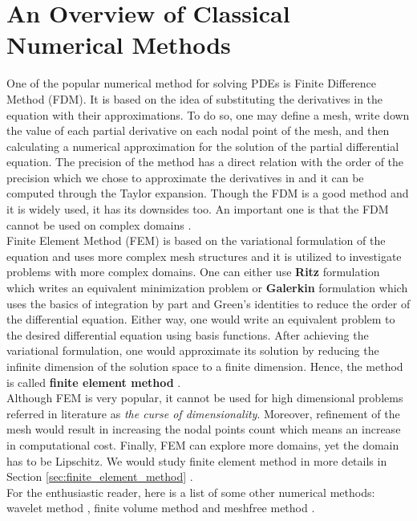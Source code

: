 \section{An Overview of Classical Numerical Methods}
\label{sec:overviewof_FEM_FDM}
One of the popular  numerical method for solving PDEs is  Finite Difference Method (FDM). It is based on the idea of substituting the derivatives in the equation with their approximations. To do so, one may define a mesh, write down the value of each partial derivative on each nodal point of the mesh, and then calculating a numerical approximation for the solution of the partial differential equation. The precision of the method has a direct relation with the order of the precision which we chose to approximate the derivatives in and it can be computed through the Taylor expansion. Though the FDM is a good method and it is widely used, it has its downsides too. An important one is that the FDM cannot be used on complex domains \cite{forsythe1960finite, smith1985numerical, morton2005numerical}.\\
Finite Element Method (FEM) is based on the variational formulation of the equation and uses more complex mesh structures and it is utilized to investigate problems with more complex domains. One can either use \textbf{Ritz} formulation which writes an equivalent minimization problem or \textbf{Galerkin} formulation which uses the basics of integration by part and Green's identities to reduce the order of the differential equation. Either way, one would write an equivalent problem to the desired differential equation using basis functions. After achieving the variational formulation, one would approximate its solution by reducing the infinite dimension of the solution space to a finite dimension. Hence, the method is called \textbf{finite element method} \cite{suli2012lecture, johnson2012numerical}.\\
Although FEM is very popular, it cannot be used for high dimensional problems referred in literature as \textit{the curse of dimensionality}. Moreover, refinement of the mesh would result in increasing the nodal points count which means an increase in computational cost. Finally, FEM can explore more domains, yet the domain has to be Lipschitz. We would study finite element method in more details in Section \eqref{sec:finite_element_method} \cite{zienkiewicz1977finite, cook2007concepts}.\\
For the enthusiastic reader, here is a list of some other numerical methods: wavelet method \cite{dahmen1997multiscale, lepik2005numerical}, finite volume method \cite{moukalled2016finite, leveque2002finite} and meshfree method \cite{liu2003smoothed, liu2009meshfree}.
